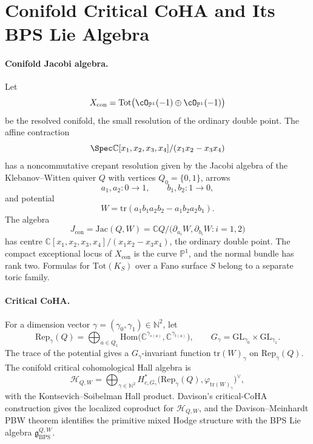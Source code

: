 \providecommand{\cH}{\mathcal{H}}
\providecommand{\fg}{\mathfrak{g}}
\providecommand{\fgl}{\mathfrak{gl}}
\providecommand{\fsl}{\mathfrak{sl}}
\providecommand{\DT}{\Omega}
\providecommand{\bP}{\mathbb{P}}
\providecommand{\C}{\mathbb{C}}
\providecommand{\CoHA}{\mathrm{CoHA}}
\providecommand{\BPS}{\mathrm{BPS}}
\providecommand{\Jac}{\mathrm{Jac}}
\providecommand{\Rep}{\mathrm{Rep}}
\providecommand{\tr}{\mathrm{tr}}

\section*{Conifold Critical CoHA and Its BPS Lie Algebra}
\label{sec:davison-conifold-coha}

\paragraph{Conifold Jacobi algebra.}
Let
\[
  X_{\mathrm{con}}=\mathrm{Tot}\bigl(\cO_{\bP^1}(-1)\oplus
  \cO_{\bP^1}(-1)\bigr)
\]
be the resolved conifold, the small resolution of the ordinary double
point. The affine contraction
\[
  \Spec \C[x_1,x_2,x_3,x_4]/(x_1x_2-x_3x_4)
\]
has a noncommutative crepant resolution given by the Jacobi algebra of
the Klebanov--Witten quiver \(Q\) with vertices \(Q_0=\{0,1\}\), arrows
\[
  a_1,a_2\colon 0\to 1,\qquad b_1,b_2\colon 1\to 0,
\]
and potential
\[
  W=\tr(a_1 b_1 a_2 b_2-a_1 b_2 a_2 b_1).
\]
The algebra
\[
  J_{\mathrm{con}}=\Jac(Q,W)
  =\C Q/\bigl(\partial_{a_i}W,\partial_{b_i}W: i=1,2\bigr)
\]
has centre
\(\C[x_1,x_2,x_3,x_4]/(x_1x_2-x_3x_4)\), the ordinary double
point. The compact exceptional locus of \(X_{\mathrm{con}}\) is the
curve \(\bP^1\), and the normal bundle has rank two. Formulas for
\(\mathrm{Tot}(K_S)\) over a Fano surface \(S\) belong to a separate
toric family.

\paragraph{Critical CoHA.}
For a dimension vector \(\gamma=(\gamma_0,\gamma_1)\in\mathbb N^2\), let
\[
  \Rep_\gamma(Q)=
  \bigoplus_{a\in Q_1}\mathrm{Hom}\bigl(\C^{\gamma_{s(a)}},
  \C^{\gamma_{t(a)}}\bigr),\qquad
  G_\gamma=\mathrm{GL}_{\gamma_0}\times\mathrm{GL}_{\gamma_1}.
\]
The trace of the potential gives a \(G_\gamma\)-invariant function
\(\tr(W)_\gamma\) on \(\Rep_\gamma(Q)\). The conifold critical
cohomological Hall algebra is
\[
  \cH_{Q,W}
  =\bigoplus_{\gamma\in\mathbb N^2}
  H^{*}_{c,G_\gamma}\bigl(\Rep_\gamma(Q),
  \varphi_{\tr(W)_\gamma}\bigr)^\vee ,
\]
with the Kontsevich--Soibelman Hall product. Davison's critical-CoHA
construction gives the localized coproduct for \(\cH_{Q,W}\), and the
Davison--Meinhardt PBW theorem identifies the primitive mixed Hodge
structure with the BPS Lie algebra \(\fg_{\BPS}^{Q,W}\).

